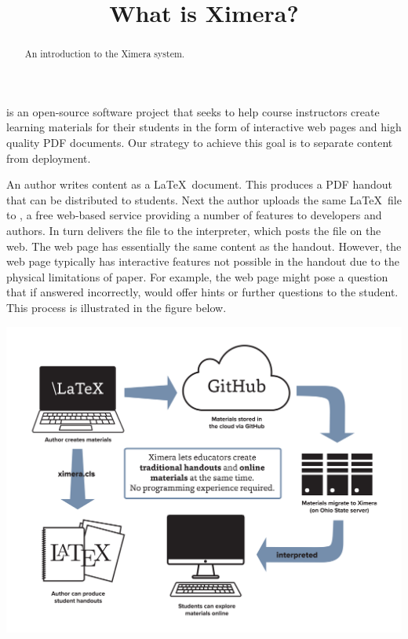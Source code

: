 \documentclass{ximera}
\title{What is Ximera?}
\begin{document}
\begin{abstract}
An introduction to the Ximera system.
\end{abstract}
\maketitle


 is an open-source software
project that seeks to help course instructors create learning
materials for their students in the form of interactive web pages and
high quality PDF documents.  Our strategy to achieve this goal is to
separate content from deployment.

An author writes content as a \LaTeX\ document.  This produces a PDF
handout that can be distributed to students.  Next the author uploads
the same \LaTeX\ file to , a free
web-based service providing a number of features to developers and
authors.  In turn  delivers the
file to the  interpreter, which
  posts the file on the web.  The web page has essentially the same
  content as the handout.  However, the web page typically has
  interactive features not possible in the handout due to the physical
  limitations of paper.  For example, the web page might pose a
  question that if answered incorrectly, would offer hints or further
  questions to the student.  This process is illustrated in the figure
  below.

\begin{image}
\includegraphics[scale=.25]{./XimeraGraphic.png}
\end{image}
\end{document}

